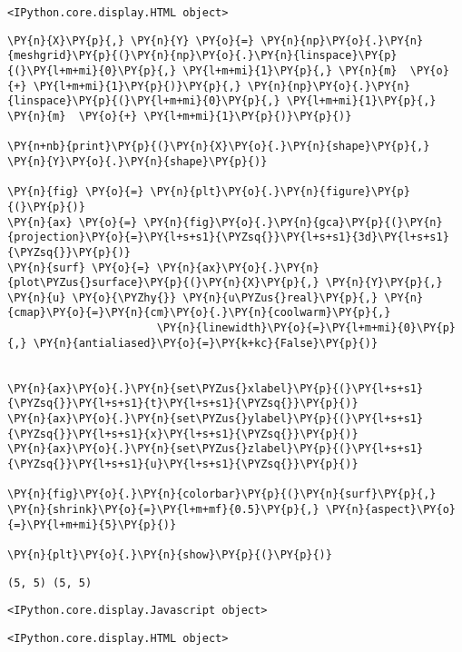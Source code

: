     
    
    \begin{verbatim}
<IPython.core.display.HTML object>
    \end{verbatim}

    
    \begin{tcolorbox}[breakable, size=fbox, boxrule=1pt, pad at break*=1mm,colback=cellbackground, colframe=cellborder]
\begin{Verbatim}[commandchars=\\\{\}]
\PY{n}{X}\PY{p}{,} \PY{n}{Y} \PY{o}{=} \PY{n}{np}\PY{o}{.}\PY{n}{meshgrid}\PY{p}{(}\PY{n}{np}\PY{o}{.}\PY{n}{linspace}\PY{p}{(}\PY{l+m+mi}{0}\PY{p}{,} \PY{l+m+mi}{1}\PY{p}{,} \PY{n}{m}  \PY{o}{+} \PY{l+m+mi}{1}\PY{p}{)}\PY{p}{,} \PY{n}{np}\PY{o}{.}\PY{n}{linspace}\PY{p}{(}\PY{l+m+mi}{0}\PY{p}{,} \PY{l+m+mi}{1}\PY{p}{,} \PY{n}{m}  \PY{o}{+} \PY{l+m+mi}{1}\PY{p}{)}\PY{p}{)}

\PY{n+nb}{print}\PY{p}{(}\PY{n}{X}\PY{o}{.}\PY{n}{shape}\PY{p}{,} \PY{n}{Y}\PY{o}{.}\PY{n}{shape}\PY{p}{)}

\PY{n}{fig} \PY{o}{=} \PY{n}{plt}\PY{o}{.}\PY{n}{figure}\PY{p}{(}\PY{p}{)}
\PY{n}{ax} \PY{o}{=} \PY{n}{fig}\PY{o}{.}\PY{n}{gca}\PY{p}{(}\PY{n}{projection}\PY{o}{=}\PY{l+s+s1}{\PYZsq{}}\PY{l+s+s1}{3d}\PY{l+s+s1}{\PYZsq{}}\PY{p}{)}
\PY{n}{surf} \PY{o}{=} \PY{n}{ax}\PY{o}{.}\PY{n}{plot\PYZus{}surface}\PY{p}{(}\PY{n}{X}\PY{p}{,} \PY{n}{Y}\PY{p}{,} \PY{n}{u} \PY{o}{\PYZhy{}} \PY{n}{u\PYZus{}real}\PY{p}{,} \PY{n}{cmap}\PY{o}{=}\PY{n}{cm}\PY{o}{.}\PY{n}{coolwarm}\PY{p}{,}
                       \PY{n}{linewidth}\PY{o}{=}\PY{l+m+mi}{0}\PY{p}{,} \PY{n}{antialiased}\PY{o}{=}\PY{k+kc}{False}\PY{p}{)}


\PY{n}{ax}\PY{o}{.}\PY{n}{set\PYZus{}xlabel}\PY{p}{(}\PY{l+s+s1}{\PYZsq{}}\PY{l+s+s1}{t}\PY{l+s+s1}{\PYZsq{}}\PY{p}{)}
\PY{n}{ax}\PY{o}{.}\PY{n}{set\PYZus{}ylabel}\PY{p}{(}\PY{l+s+s1}{\PYZsq{}}\PY{l+s+s1}{x}\PY{l+s+s1}{\PYZsq{}}\PY{p}{)}
\PY{n}{ax}\PY{o}{.}\PY{n}{set\PYZus{}zlabel}\PY{p}{(}\PY{l+s+s1}{\PYZsq{}}\PY{l+s+s1}{u}\PY{l+s+s1}{\PYZsq{}}\PY{p}{)}

\PY{n}{fig}\PY{o}{.}\PY{n}{colorbar}\PY{p}{(}\PY{n}{surf}\PY{p}{,} \PY{n}{shrink}\PY{o}{=}\PY{l+m+mf}{0.5}\PY{p}{,} \PY{n}{aspect}\PY{o}{=}\PY{l+m+mi}{5}\PY{p}{)}

\PY{n}{plt}\PY{o}{.}\PY{n}{show}\PY{p}{(}\PY{p}{)}
\end{Verbatim}
\end{tcolorbox}

    \begin{Verbatim}[commandchars=\\\{\}]
(5, 5) (5, 5)
    \end{Verbatim}

    
    \begin{verbatim}
<IPython.core.display.Javascript object>
    \end{verbatim}

    
    
    \begin{verbatim}
<IPython.core.display.HTML object>
    \end{verbatim}

    

    

